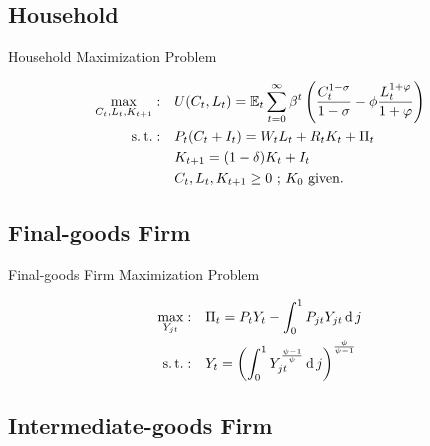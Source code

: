 \documentclass[
presentation.tex
]{subfiles}
\begin{document}
\subsection{Household}

\begin{frame}{Household Maximization Problem}
	
	\begin{align}
		\label{eq:household-utility-function}
		\max_{C_t,L_t,K_{t+1}}: \quad & U(C_t,L_t) = {\mathbb{E}_{t}} \sum_{t=0}^{\infty} \beta^t \left(\frac{C_t^{1-\sigma}}{1-\sigma} - \phi \frac{L_t^{1+\varphi}}{1+\varphi} \right) \\
		\label{eq:household-budget-constraint}
		\operatorname{s.t.}: \quad & P_t (C_t + I_t) = W_t L_t + R_t K_t + \Pi_t \\
		\label{eq:law-of-motion-for-capital}
		\quad & K_{t+1} = (1-\delta)K_t + I_t \\
		\quad & C_t,L_t,K_{t+1} \geq 0 \text{ ; $K_0$ given.} \nonumber
	\end{align}
	
\end{frame}


\subsection{Final-goods Firm}

	\begin{frame}{Final-goods Firm Maximization Problem}
	
	\begin{align}
		\label{eq:final-good-firm-max-problem}
		\max_{Y_{jt}}: &\quad \Pi_t = P_t Y_t - \int_{0}^{1} P_{jt} Y_{jt} \operatorname{d} j\\
		\label{eq:final-good-firm-bundle-rule}
		\operatorname{s.t.}: & \quad Y_t = \left( \int_{0}^{1} Y_{jt}^{\frac{\psi-1}{\psi}} \operatorname{d} j \right)^{\frac{\psi}{\psi-1}}
	\end{align}
	
	
	\end{frame}


\subsection{Intermediate-goods Firm}
\end{document}
